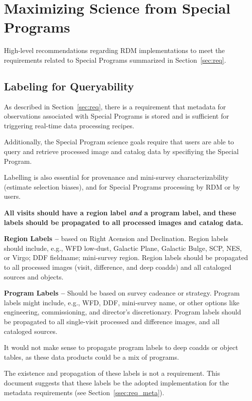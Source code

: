 \section{Maximizing Science from Special Programs}\label{sec:sci}

High-level recommendations regarding RDM implementations to meet the 
requirements related to Special Programs summarized in Section~\ref{sec:req}.


\subsection{Labeling for Queryability}\label{ssec:sci_labels}

As described in Section~\ref{sec:req}, there is a requirement that metadata for 
observations associated with Special Programs is stored and is sufficient for 
triggering real-time data processing recipes.

Additionally, the Special Program science goals require that users are able to 
query and retrieve processed image and catalog data by specifiying the Special Program. 

Labelling is also essential for provenance and mini-survey 
characterizability (estimate selection biases), and for Special Programs 
processing by RDM or by users.

\textbf{All visits should have a region label \textit{and} a program 
label, and these labels should be propagated to all processed images and catalog data.}

\textbf{Region Labels -- } based on Right Acension and Declination.
Region labels should include, e.g., WFD low-dust, Galactic Plane, Galactic 
Bulge, SCP, NES, or Virgo; DDF fieldname; mini-survey region.
Region labels should be propagated to all processed images (visit, 
difference, and deep coadds) and all cataloged sources and objects. 

\textbf{Program Labels -- } 
Should be based on survey cadeance or strategy.
Program labels might include, e.g., WFD, DDF, mini-survey name, or other 
options like engineering, commissioning, and director's discretionary.
Program labels should be propagated to all single-visit processed and 
difference images, and all cataloged sources.

It would not make sense to propagate program labels to deep coadds or 
object tables, as these data products could be a mix of programs.

The existence and propagation of these labels is not a requirement.
This document suggests that these labels be the adopted implementation for 
the metadata requirements (see Section~\ref{ssec:req_meta}).


